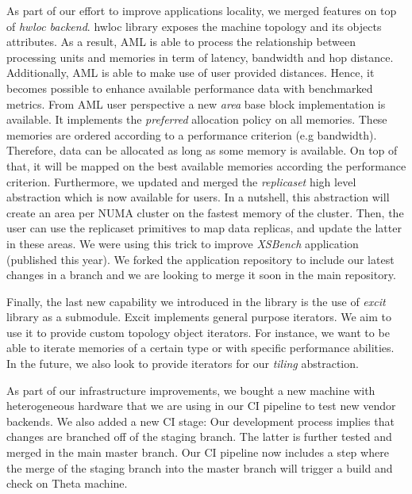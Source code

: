 As part of our effort to improve applications locality, we merged
features on top of \emph{hwloc backend}. hwloc library exposes the machine
topology and its objects attributes. As a result, AML is able
to process the relationship between processing units and memories in
term of latency, bandwidth and hop distance. Additionally, AML is
able to make use of user provided distances. Hence, it becomes
possible to enhance available performance data with benchmarked metrics.
From AML user perspective a new \emph{area} base block implementation
is available. It implements the \emph{preferred} allocation policy on all
memories. These memories are ordered according to a performance
criterion (e.g bandwidth). Therefore, data can be allocated as long as
some memory is available. On top of that, it will be mapped on the best
available memories according the performance criterion. Furthermore,
we updated and merged the \emph{replicaset} high level abstraction which
is now available for users. In a nutshell, this abstraction will
create an area per NUMA cluster on the fastest memory of the cluster.
Then, the user can use the replicaset primitives to map data replicas,
and update the latter in these areas. We were using this trick to improve
\emph{XSBench} application (published this year). We forked the application
repository to include our latest changes in a branch and we are looking to
merge it soon in the main repository.

Finally, the last new capability we introduced in the library is the
use of \emph{excit} library as a submodule. Excit implements general
purpose iterators. We aim to use it to provide custom topology object
iterators. For instance, we want to be able to iterate memories of
a certain type or with specific performance abilities. In the future,
we also look to provide iterators for our \emph{tiling} abstraction.

As part of our infrastructure improvements, we bought a new machine
with heterogeneous hardware that we are using in our CI pipeline
to test new vendor backends. We also added a new CI stage:
Our development process implies that changes are branched off of the staging
branch. The latter is further tested and merged in the main master branch.
Our CI pipeline now includes a step where the merge of the staging branch into
the master branch will trigger a build and check on Theta machine.


